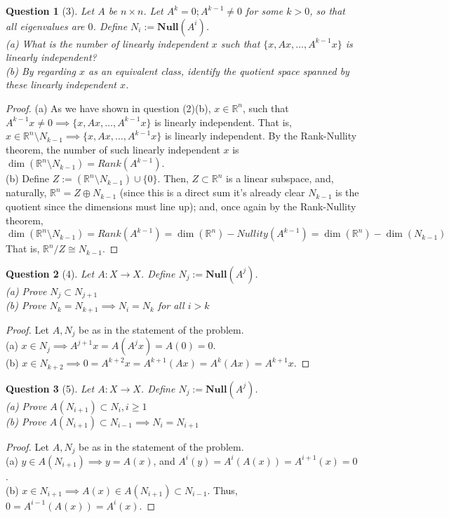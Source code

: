 \documentclass[11pt]{article}
\theoremstyle{quest}
\newtheorem*{question}{Question}
\begin{document}
\begin{question}[3]
Let $A$ be $n \times n$. Let $A^k = 0; A^{k-1} \ne 0$ for some $k > 0$, so that all eigenvalues are $0$. Define $N_i := \mathbf{Null}(A^i)$.
\\(a) What is the number of linearly independent $x$ such that $\{x, Ax, \ldots, A^{k-1}x\}$ is linearly independent?
\\(b) By regarding $x$ as an equivalent class, identify the quotient space spanned by these linearly independent $x$. 
\end{question}
\begin{proof}
(a) As we have shown in question (2)(b), $x \in \mathbb{R}^n$, such that $A^{k-1} x \ne 0 \implies \{x, Ax, \ldots, A^{k-1}x\}$ is linearly independent. That is, $x \in \mathbb{R}^n \setminus N_{k-1} \implies \{x, Ax, \ldots, A^{k-1}x\}$ is linearly independent. By the Rank-Nullity theorem, the number of such linearly independent $x$ is $\dim(\mathbb{R}^n \setminus N_{k-1}) = Rank(A^{k-1})$.
\\(b) Define $Z := (\mathbb{R}^n \setminus N_{k-1}) \cup \{0\}$. Then, $Z \subset \mathbb{R}^n$ is a linear subspace, and, naturally, $\mathbb{R}^n = Z \oplus N_{k-1}$ (since this is a direct sum it's already clear $N_{k-1}$ is the quotient since the dimensions must line up); and, once again by the Rank-Nullity theorem, $$\dim(\mathbb{R}^n \setminus N_{k-1}) = Rank(A^{k-1}) = \dim(\mathbb{R}^n) - Nullity(A^{k-1}) = \dim(\mathbb{R}^n) - \dim(N_{k-1})$$
That is, $\mathbb{R}^n / Z \cong N_{k-1}$.
\end{proof}
\begin{question}[4]
Let $A: X \rightarrow X$. Define $N_j := \mathbf{Null}(A^j)$.
\\(a) Prove $N_j \subset N_{j+1}$
\\(b) Prove $N_k = N_{k+1} \implies N_i = N_k$ for all $i > k$
\end{question}
\begin{proof}
  Let $A, N_j$ be as in the statement of the problem.
  \\(a) $x \in N_j \implies A^{j+1}x = A(A^j x) = A(0) = 0$.
  \\(b) $x \in N_{k+2} \implies 0 = A^{k+2}x = A^{k+1}(Ax) = A^k(Ax) = A^{k+1}x$.
\end{proof}
\begin{question}[5]
Let $A: X \rightarrow X$. Define $N_j := \mathbf{Null}(A^j)$.
\\(a) Prove $A(N_{i+1}) \subset N_i, i \ge 1$
\\(b) Prove $A(N_{i+1}) \subset N_{i-1} \implies N_i = N_{i+1}$
\end{question}
\begin{proof}
Let $A, N_j$ be as in the statement of the problem.
  \\(a) $y \in A(N_{i+1}) \implies y = A(x)$, and $A^i(y) = A^i(A(x)) = A^{i+1}(x) = 0$.
  \\(b) $x \in N_{i+1} \implies A(x) \in A(N_{i+1}) \subset N_{i-1}$. Thus, $0 = A^{i-1}(A(x)) = A^i(x)$.
\end{proof}
\end{document}
